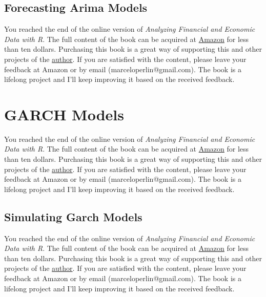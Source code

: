 \documentclass[
  12pt,
]{book}
\newenvironment{pleasebuyit}
{\begin{noteblock}
		
	} {\end{noteblock}}
\begin{document}
\hypertarget{forecasting-arima-models}{%
\subsection{Forecasting Arima Models}\label{forecasting-arima-models}}

\begin{pleasebuyit}
You reached the end of the online version of \emph{Analyzing Financial
and Economic Data with R}. The full content of the book can be acquired
at \href{https://www.amazon.com/dp/B084LSNXMN}{Amazon} for less than ten
dollars. Purchasing this book is a great way of supporting this and
other projects of the \href{https://www.msperlin.com/}{author}. If you
are satisfied with the content, please leave your feedback at Amazon or
by email (marceloperlin@gmail.com). The book is a lifelong project and
I'll keep improving it based on the received feedback.
\end{pleasebuyit}

\hypertarget{garch-models}{%
\section{GARCH Models}\label{garch-models}}

\begin{pleasebuyit}
You reached the end of the online version of \emph{Analyzing Financial
and Economic Data with R}. The full content of the book can be acquired
at \href{https://www.amazon.com/dp/B084LSNXMN}{Amazon} for less than ten
dollars. Purchasing this book is a great way of supporting this and
other projects of the \href{https://www.msperlin.com/}{author}. If you
are satisfied with the content, please leave your feedback at Amazon or
by email (marceloperlin@gmail.com). The book is a lifelong project and
I'll keep improving it based on the received feedback.
\end{pleasebuyit}

\hypertarget{simulating-garch-models}{%
\subsection{Simulating Garch Models}\label{simulating-garch-models}}

\begin{pleasebuyit}
You reached the end of the online version of \emph{Analyzing Financial
and Economic Data with R}. The full content of the book can be acquired
at \href{https://www.amazon.com/dp/B084LSNXMN}{Amazon} for less than ten
dollars. Purchasing this book is a great way of supporting this and
other projects of the \href{https://www.msperlin.com/}{author}. If you
are satisfied with the content, please leave your feedback at Amazon or
by email (marceloperlin@gmail.com). The book is a lifelong project and
I'll keep improving it based on the received feedback.
\end{pleasebuyit}
\end{document}
